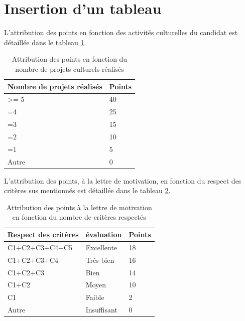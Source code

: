 \section{Insertion d'un tableau}

L'attribution des points en fonction des activités culturelles du candidat est détaillée dans le tableau \ref{tab3}. 

\begin{table}
\begin{center}
\caption{Attribution des points en fonction du nombre de projets culturels réalisés}
\label{tab3}
\begin{tabular}{|l|l|}
\hline
\rowcolor[gray]{0.8}\bfseries Nombre de projets réalisés & \bfseries Points\\
\hline
>= 5 &40\\
\hline
=4 & 25\\
\hline
=3 & 15\\
\hline
=2 &10\\
\hline
=1 & 5\\
\hline
Autre & 0\\
\hline
\end{tabular}
\end{center}

\end{table}





L'attribution des points, à la lettre de motivation, en fonction du respect des critères sus mentionnés est détaillée dans le tableau \ref{tab5}.

\begin{table}
\begin{center}
\caption{Attribution des points à la lettre de motivation en fonction du nombre de critères respectés}
\label{tab5}
\begin{tabular}{|l|l|l|}
\hline
\rowcolor[gray]{0.8}\bfseries Respect des critères &\bfseries évaluation &\bfseries Points \\
\hline
C1+C2+C3+C4+C5 & Excellente &18\\
\hline
C1+C2+C3+C4 & Trés bien & 16\\
\hline
C1+C2+C3 & Bien & 14\\
\hline
C1+C2 & Moyen &10\\
\hline
C1 & Faible & 2\\
\hline
Autre & Insuffisant & 0\\
\hline
\end{tabular}
\end{center}

\end{table}



